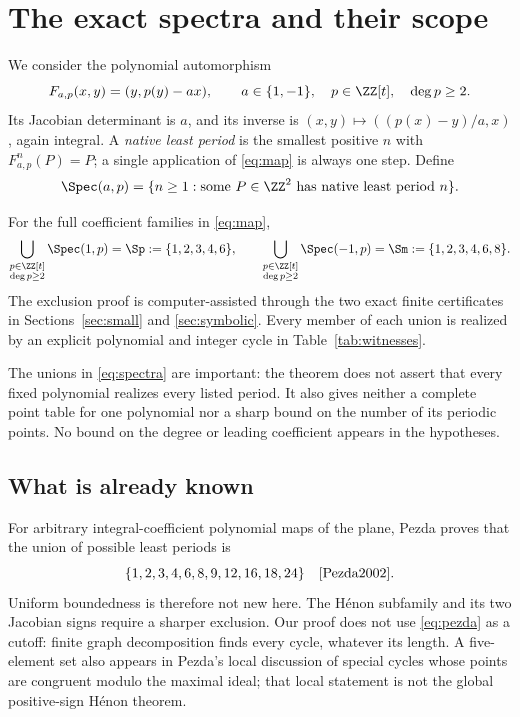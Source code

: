 \section{The exact spectra and their scope}\label{sec:theorem}

We consider the polynomial automorphism
\begin{equation}\label{eq:map}
 F_{a,p}(x,y)=(y,p(y)-ax),\qquad
 a\in\{1,-1\},\quad p\in\ZZ[t],\quad\deg p\ge2.
\end{equation}
Its Jacobian determinant is $a$, and its inverse is
$(x,y)\mapsto((p(x)-y)/a,x)$, again integral. A \emph{native least
period} is the smallest positive $n$ with $F_{a,p}^n(P)=P$; a single
application of \eqref{eq:map} is always one step. Define
\[
 \Spec(a,p)=\{n\ge1:\text{some }P\in\ZZ^2
                    \text{ has native least period }n\}.
\]

\begin{theorem}\label{thm:spectra}
For the full coefficient families in \eqref{eq:map},
\begin{equation}\label{eq:spectra}
 \bigcup_{\substack{p\in\ZZ[t]\\\deg p\ge2}}\Spec(1,p)
 =\Sp:=\{1,2,3,4,6\},\qquad
 \bigcup_{\substack{p\in\ZZ[t]\\\deg p\ge2}}\Spec(-1,p)
 =\Sm:=\{1,2,3,4,6,8\}.
\end{equation}
The exclusion proof is computer-assisted through the two exact finite
certificates in Sections~\ref{sec:small} and \ref{sec:symbolic}.
Every member of each union is realized by an explicit polynomial
and integer cycle in Table~\ref{tab:witnesses}.
\end{theorem}

The unions in \eqref{eq:spectra} are important: the theorem does not
assert that every fixed polynomial realizes every listed period.
It also gives neither a complete point table for one polynomial nor
a sharp bound on the number of its periodic points. No bound on
the degree or leading coefficient appears in the hypotheses.

\subsection{What is already known}
For arbitrary integral-coefficient polynomial maps of the plane,
Pezda proves that the union of possible least periods is
\begin{equation}\label{eq:pezda}
 \{1,2,3,4,6,8,9,12,16,18,24\}
 \quad\text{\cite[Theorem~2.1]{Pezda2002}}.
\end{equation}
Uniform boundedness is therefore not new here. The H\'enon subfamily
and its two Jacobian signs require a sharper exclusion. Our proof
does not use \eqref{eq:pezda} as a cutoff: finite graph decomposition
finds every cycle, whatever its length. A five-element set also
appears in Pezda's local discussion of special cycles whose points
are congruent modulo the maximal ideal; that local statement is
not the global positive-sign H\'enon theorem.

